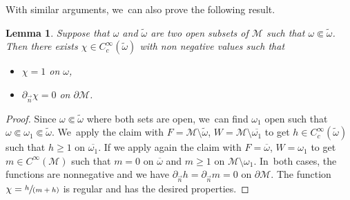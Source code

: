 \documentclass[JEP,XML,SOM,Unicode,published]{cedram}
\newcommand{\spfrac}[2]{\sfrac{#1}{(#2)}}
\newtheorem{lemma}[theorem]{Lemma}
\theoremstyle{definition}
\let\mc\mathcal
\newcommand{\M}{\mc{M}}
\begin{document}
With similar arguments, we~can also prove the following result.
\begin{lemma}\label{lemma:omomtilde-smaller-subset}
Suppose that $\omega$ and $\widetilde{\omega}$ are two open subsets of $\M$ such that $\omega \Subset \widetilde{\omega}$. Then there exists $\chi\in C^{\infty}_c(\widetilde{\omega})$ with non negative values such that
\begin{itemize}
\item $\chi=1$ on $\omega$,
\item $\partial_{\vec n} \chi=0$ on $\partial \M$.
\end{itemize}
\end{lemma}
\begin{proof}
Since $\omega \Subset \widetilde{\omega}$ where both sets are open, we~can find $\omega_1$ open such that $\omega \Subset \omega_1 \Subset \widetilde{\omega}$. We~apply the claim with $F=\M\setminus \widetilde{\omega}$, $W=\M\setminus \overline{\omega_1}$ to get $h\in C^{\infty}_c(\widetilde{\omega})$ such that $h\geq 1$ on $\overline{\omega_1}$. If we apply again the claim with $F=\overline{\omega}$, $W=\omega_1$ to get $m\in C^{\infty}(\M)$ such that $m=0$ on $\overline{\omega}$ and $m\geq 1$ on $\M\setminus\omega_1$. In~both cases, the functions are nonnegative and we have $\partial_{\vec n} h=\partial_{\vec n} m=0$ on $\partial \M$. The function $\chi=\spfrac{h}{m+h}$ is regular and has the desired properties.
\end{proof}

\backmatter


\end{document}
